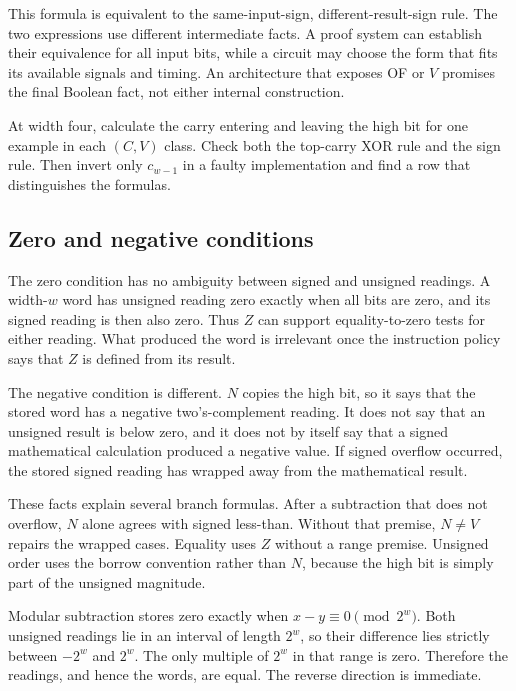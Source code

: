 This formula is equivalent to the same-input-sign, different-result-sign rule.
The two expressions use different intermediate facts. A proof system can
establish their equivalence for all input bits, while a circuit may choose the
form that fits its available signals and timing. An architecture that exposes
OF or \(V\) promises the final Boolean fact, not either internal construction.

\begin{tryit}[title={Compare two overflow implementations}]
At width four, calculate the carry entering and leaving the high bit for one
example in each \((C,V)\) class. Check both the top-carry XOR rule and the sign
rule. Then invert only \(c_{w-1}\) in a faulty implementation and find a row
that distinguishes the formulas.
\end{tryit}

\subsection{Zero and negative conditions}

The zero condition has no ambiguity between signed and unsigned readings. A width-\(w\) word has
unsigned reading zero exactly when all bits are zero, and its signed reading is
then also zero. Thus \(Z\) can support equality-to-zero tests for either
reading. What produced the word is irrelevant once the instruction policy says
that \(Z\) is defined from its result.

The negative condition is different. \(N\) copies the high bit, so it says
that the stored word has a negative two's-complement reading. It does not say
that an unsigned result is below zero, and it does not by itself say that a
signed mathematical calculation produced a negative value. If signed
overflow occurred, the stored signed reading has wrapped away from the
mathematical result.

These facts explain several branch formulas. After a subtraction that does not
overflow, \(N\) alone agrees with signed less-than. Without that premise,
\(N\ne V\) repairs the wrapped cases. Equality uses \(Z\) without a range
premise. Unsigned order uses the borrow convention rather than \(N\), because
the high bit is simply part of the unsigned magnitude.

\begin{proofkit}[title={Zero after subtraction means equal words}]
Modular subtraction stores zero exactly when
\(x-y\equiv0\pmod{2^w}\). Both unsigned readings lie in an interval of
length \(2^w\), so their difference lies strictly between \(-2^w\) and
\(2^w\). The only multiple of \(2^w\) in that range is zero. Therefore the
readings, and hence the words, are equal. The reverse direction is immediate.
\end{proofkit}

